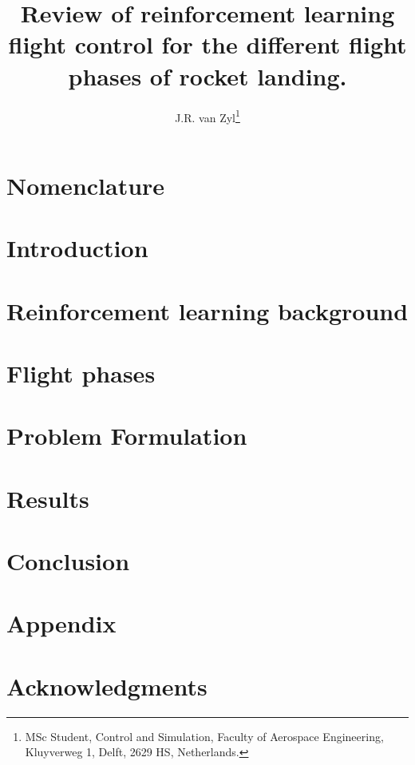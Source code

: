 \documentclass[conf]{new-aiaa}
\title{Review of reinforcement learning flight control for the different flight phases of rocket landing.}
\author{J.R. van Zyl\footnote{MSc Student, Control and Simulation, Faculty of Aerospace Engineering, Kluyverweg 1, Delft, 2629 HS, Netherlands.}}
\affil{Delft University of Technology, Netherlands, 2628 HS}
\begin{document}
\maketitle

\begin{abstract}

\end{abstract}

\section{Nomenclature}


\section{Introduction}
\label{sec:introduction}


\section{Reinforcement learning background}
\label{sec:rl}


\section{Flight phases}
\label{sec:flight_phases}


\section{Problem Formulation}
\label{sec:problem_formualtion}


\section{Results}
\label{sec:results}



\section{Conclusion}
\label{sec:conclusion}


\section*{Appendix}

\section*{Acknowledgments}



\end{document}
